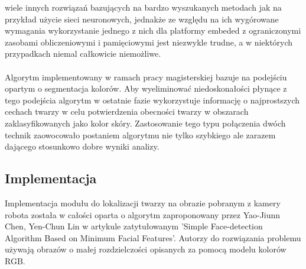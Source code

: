 wiele innych rozwiązań bazujących na bardzo wyszukanych metodach jak na przykład
użycie sieci neuronowych, jednakże ze względu na ich wygórowane wymagania
wykorzystanie jednego z nich dla platformy embeded z ograniczonymi zasobami
obliczeniowymi i pamięciowymi jest niezwykle trudne, a w niektórych przypadkach
niemal całkowicie niemożliwe.\\
\\
Algorytm implementowany w ramach pracy magisterskiej bazuje na podejściu opartym
o segmentacja kolorów. Aby wyeliminować niedoskonałości płynące z tego podejścia
algorytm w ostatnie fazie wykorzystuje informację o najprostszych cechach twarzy
w celu potwierdzenia obecności twarzy w obszarach zaklasyfikowanych jako kolor
skóry. Zastosowanie tego typu połączenia dwóch technik zaowocowało postaniem
algorytmu nie tylko szybkiego ale zarazem dającego stosunkowo dobre wyniki
analizy.
 


\subsection{Implementacja}
Implementacja modułu do lokalizacji twarzy na obrazie pobranym z kamery robota
została w całości oparta o algorytm zaproponowany przez Yao-Jiunn Chen, Yen-Chun
Lin w artykule zatytułowanym 'Simple Face-detection Algorithm Based on Minimum
Facial Features'. Autorzy do rozwiązania problemu używają obrazów o małej
rozdzielczości opisanych za pomocą modelu kolorów RGB. 


